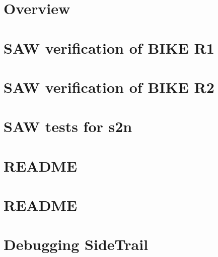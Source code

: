 \documentclass[twoside]{book}
\newcommand{\+}{\discretionary{\mbox{\scriptsize$\hookleftarrow$}}{}{}}
\begin{document}
\chapter{Overview}
\label{md_crt_aws_crt_cpp_crt_s2n_tests_pems_trust_store__r_e_a_d_m_e}

\chapter{SAW verification of BIKE R1}
\label{md_crt_aws_crt_cpp_crt_s2n_tests_saw_bike_r1__r_e_a_d_m_e}

\chapter{SAW verification of BIKE R2}
\label{md_crt_aws_crt_cpp_crt_s2n_tests_saw_bike_r2__r_e_a_d_m_e}

\chapter{SAW tests for s2n}
\label{md_crt_aws_crt_cpp_crt_s2n_tests_saw__r_e_a_d_m_e}

\chapter{README}
\label{md_crt_aws_crt_cpp_crt_s2n_tests_saw_sike_r1__r_e_a_d_m_e}

\chapter{README}
\label{md_crt_aws_crt_cpp_crt_s2n_tests_saw_spec_extras__h_m_a_c__r_e_a_d_m_e}

\chapter{Debugging Side\+Trail}
\label{md_crt_aws_crt_cpp_crt_s2n_tests_sidetrail__d_e_b_u_g_g_i_n_g}

\end{document}
